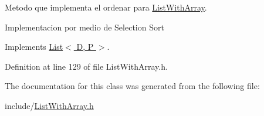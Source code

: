 Metodo que implementa el ordenar para \hyperlink{class_list_with_array}{List\+With\+Array}. 

Implementacion por medio de Selection Sort 

Implements \hyperlink{class_list_ae3795939f27cf3e688cd470450e0c27a}{List$<$ D, P $>$}.



Definition at line 129 of file List\+With\+Array.\+h.



The documentation for this class was generated from the following file\+:\begin{DoxyCompactItemize}
\item 
include/\hyperlink{_list_with_array_8h}{List\+With\+Array.\+h}\end{DoxyCompactItemize}

